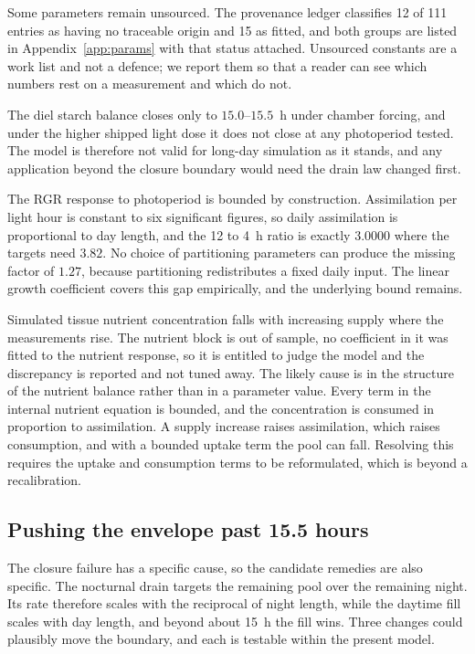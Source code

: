 Some parameters remain unsourced. The provenance ledger classifies 12 of 111
entries as having no traceable origin and 15 as fitted, and both groups are
listed in Appendix~\ref{app:params} with that status attached. Unsourced
constants are a work list and not a defence; we report them so that a reader
can see which numbers rest on a measurement and which do not.

The diel starch balance closes only to $15.0$--$15.5$~h under chamber forcing,
and under the higher shipped light dose it does not close at any photoperiod
tested. The model is therefore not valid for long-day simulation as it stands,
and any application beyond the closure boundary would need the drain law
changed first.

The RGR response to photoperiod is bounded by construction. Assimilation per
light hour is constant to six significant figures, so daily assimilation is
proportional to day length, and the 12 to 4~h ratio is exactly $3.0000$ where
the targets need $3.82$. No choice of partitioning parameters can produce the
missing factor of $1.27$, because partitioning redistributes a fixed daily
input. The linear growth coefficient covers this gap empirically, and the
underlying bound remains.

Simulated tissue nutrient concentration falls with increasing supply where the
measurements rise. The nutrient block is out of sample, no coefficient in it
was fitted to the nutrient response, so it is entitled to judge the model and
the discrepancy is reported and not tuned away. The likely cause is in the
structure of the nutrient balance rather than in a parameter value. Every term in
the internal nutrient equation is bounded, and the concentration is consumed in
proportion to assimilation. A supply increase raises assimilation,
which raises consumption, and with a bounded uptake term the pool can fall.
Resolving this requires the uptake and consumption terms to be reformulated,
which is beyond a recalibration.

\subsection{Pushing the envelope past 15.5 hours}

The closure failure has a specific cause, so the candidate remedies are also
specific. The nocturnal drain targets the remaining pool over the remaining
night. Its rate therefore scales with the reciprocal of night length, while the
daytime fill scales with day length, and beyond about 15~h the fill wins. Three
changes could plausibly move the boundary, and each is testable within the
present model.

